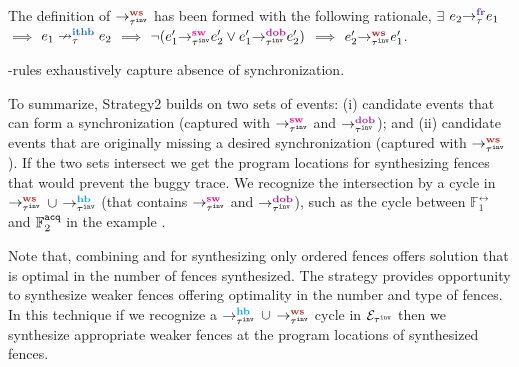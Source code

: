 \noindent
The definition of $\setWS$ has been formed with the following rationale,
	$\exists$ $\fr{\tau}{e_2}{e_1}$ $\implies$
	$\nithb{\tau}{e_1}{e_2}$ $\implies$
	$\neg(\sw{\inv{\tau}}{e_1'}{e_2'} \v \dob{\inv{\tau}}{e_1'}{e_2'})$ 
	$\implies$ $\ws{\inv{\tau}}{e_2'}{e_1'}$.

\begin{theorem} \label{thm:ws exhaustive}
	\lws-rules exhaustively capture absence of synchronization.
\end{theorem}

To summarize, Strategy2 builds on two sets of events:
(i) candidate events that can form a synchronization 
(captured with $\sw{\inv{\tau}}{}{}$ and 
$\dob{\inv{\tau}}{}{}$); and
(ii) candidate events that are originally missing a desired
synchronization (captured with $\setWS$).
If the two sets intersect we get the program locations
for synthesizing fences that would prevent the buggy trace.
We recognize the intersection by a cycle in  
$\setWS$ $\cup$ $\hb{\inv{\tau}}{}{}$ 
(that contains $\sw{\inv{\tau}}{}{}$ and $\dob{\inv{\tau}}{}{}$), 
such as the cycle between $\mathbb{F}^\rel_1$ and 
$\mathbb{F}^\texttt{acq}_2$ in the example .

Note that, combining \sfence and \wfence for synthesizing only
\sc ordered fences offers solution that is optimal in the number
of fences synthesized. 
%
The \wfence strategy provides opportunity to synthesize weaker
fences offering optimality in the number and type of fences.
%
In this technique if we recognize a $\hb{\inv{\tau}}{}{}$ $\cup$ 
$\ws{\inv{\tau}}{}{}$ cycle in $\mathcal{E}_{{\tau}^{\mathtt{inv}}}$ then we
synthesize appropriate weaker fences at the program locations  
of synthesized fences.

